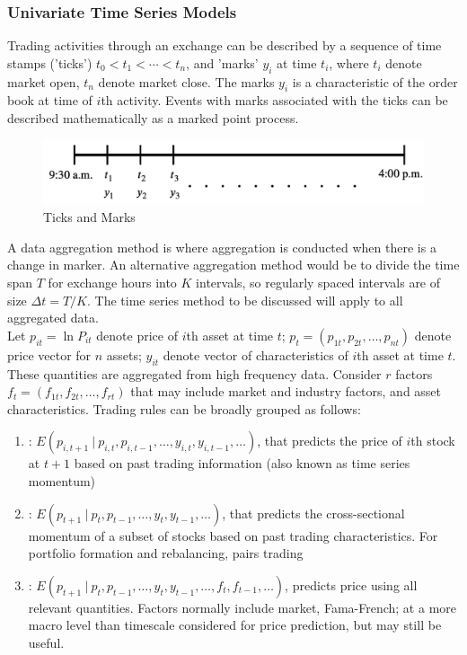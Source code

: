 \subsubsection{Univariate Time Series Models}

Trading activities through an exchange can be described by a sequence of time stamps ('ticks') $t_0 < t_1 < \cdots < t_n$, and 'marks' $y_i$ at time $t_i$, where $t_i$ denote market open, $t_n$ denote market close. The marks $y_i$ is a characteristic of the order book at time of $i$th activity. Events with marks associated with the ticks can be described mathematically as a marked point process.
\begin{figure}[H]
\centering
\includegraphics[scale=0.4]{figures/math/ticksandmarks}
\caption{Ticks and Marks}
\end{figure}

A data aggregation method is where aggregation is conducted when there is a change in marker. An alternative aggregation method would be to divide the time span $T$ for exchange hours into $K$ intervals, so regularly spaced intervals are of size $\Delta t = T/K$. The time series method to be discussed will apply to all aggregated data.\\

Let $p_{it} = \ln P_{it}$ denote price of $i$th asset at time $t$; $p_t = (p_{1t}, p_{2t}, \ldots, p_{nt})$ denote price vector for $n$ assets; $y_{it}$ denote vector of characteristics of $i$th asset at time $t$. These quantities are aggregated from high frequency data. Consider $r$ factors $f_t = (f_{1t}, f_{2t}, \ldots, f_{rt})$ that may include market and industry factors, and asset characteristics. Trading rules can be broadly grouped as follows:
\begin{enumerate}[label=\roman*.]
\setlength{\itemsep}{0pt}
\item {}: $E(p_{i, t+1} \ \vert \ p_{i,t}, p_{i, t-1}, \ldots, y_{i,t}, y_{i, t-1}, \ldots)$, that predicts the price of $i$th stock at $t+1$ based on past trading information (also known as time series momentum)
\item {}: $E(p_{t+1} \ \vert \ p_t, p_{t-1}, \ldots, y_t, y_{t-1}, \ldots)$, that predicts the cross-sectional momentum of a subset of stocks based on past trading characteristics. For portfolio formation and rebalancing, pairs trading
\item {}: $E(p_{t+1} \ \vert \ p_{t}, p_{t-1}, \ldots, y_t, y_{t-1}, \ldots, f_t, f_{t-1}, \ldots)$, predicts price using all relevant quantities. Factors normally include market, Fama-French; at a more macro level than timescale considered for price prediction, but may still be useful.
\end{enumerate}

